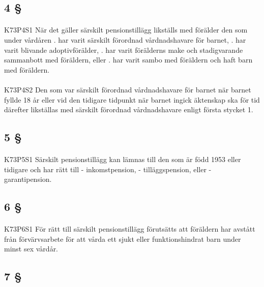 \documentclass[a4paper,notitlepage,openany,10pt]{book}
\begin{document}
\subsection*{4 §}
\paragraph*{}
{\tiny K73P4S1}
När det gäller särskilt pensionstillägg likställs med förälder den som under vårdåren
. har varit särskilt förordnad vårdnadshavare för barnet,
. har varit blivande adoptivförälder,
. har varit förälderns make och stadigvarande sammanbott med föräldern, eller
. har varit sambo med föräldern och haft barn med föräldern.
\paragraph*{}
{\tiny K73P4S2}
Den som var särskilt förordnad vårdnadshavare för barnet när barnet fyllde 18 år eller vid den tidigare tidpunkt när barnet ingick äktenskap ska för tid därefter likställas med särskilt förordnad vårdnadshavare enligt första stycket 1.
\subsection*{5 §}
\paragraph*{}
{\tiny K73P5S1}
Särskilt pensionstillägg kan lämnas till den som är född 1953 eller tidigare och har rätt till
\newline - inkomstpension,
\newline - tilläggspension, eller
\newline - garantipension.
\subsection*{6 §}
\paragraph*{}
{\tiny K73P6S1}
För rätt till särskilt pensionstillägg förutsätts att föräldern har avstått från förvärvsarbete för att vårda ett sjukt eller funktionshindrat barn under minst sex vårdår.
\subsection*{7 §}
\end{document}
